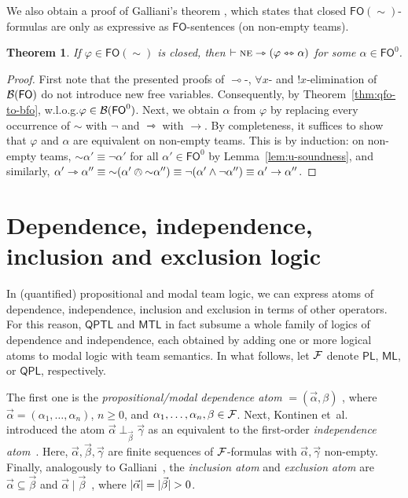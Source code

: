\documentclass[a4paper,english,fleqn,11pt,final]{scrartcl}
\makeatletter
\newcommand{\wloss}{w.l.o.g.\@\xspace}
\newcommand{\size}[1]{{\protect\ensuremath{\vert\nobreak#1\nobreak\vert}}}
\newcommand{\negg}{{\sim}}
\newcommand{\dep}[1]{{=\!\!(#1)}}
\newcommand{\logic}[1]{\ensuremath{\mathsf{#1}}\xspace}
\newcommand{\PL}{\logic{PL}}
\newcommand{\QPL}{\logic{QPL}}
\newcommand{\ML}{\logic{ML}}
\newcommand{\FO}{\logic{FO}}
\newcommand{\QPTL}{\logic{QPTL}}
\newcommand{\MTL}{\logic{MTL}}
\newcommand{\NE}{\text{\textsc{ne}}}
\newcommand{\calB}{\protect\ensuremath{\mathcal{B}}}
\newcommand{\calF}{\protect\ensuremath{\mathcal{F}}}
\newcommand{\imp}{\rightarrow}
\newcommand{\limp}{\multimap}
\newcommand{\timp}{\rightarrowtriangle}
\newcommand{\tequiv}{\leftrightarrowtriangle}
\DeclareMathOperator{\shriek}{!}
\DeclareMathOperator{\indep}{\perp}
\DeclareMathOperator{\exclusion}{\mid}
\theoremstyle{plain}
\newtheorem{theorem}{Theorem}[section]
\theoremstyle{definition}
\makeatother
\begin{document}
We also obtain a proof of Galliani's theorem \cite{Galliani14}, which states that closed $\FO(\negg)$-formulas are only as expressive as $\FO$-sentences (on non-empty teams).


\begin{theorem}
If $\varphi \in \FO(\negg)$ is closed, then $\vdash \NE \timp (\varphi \tequiv \alpha)$ for some $\alpha \in \FO^0$.
\end{theorem}
\begin{proof}
First note that the presented proofs of $\limp$-, $\forall x$- and $\shriek x$-elimination of $\calB(\FO)$ do not introduce new free variables.
Consequently, by Theorem~\ref{thm:qfo-to-bfo}, \wloss $\varphi \in \calB(\FO^0)$.
Next, we obtain $\alpha$ from $\varphi$ by replacing every occurrence of $\negg$ with $\neg$ and $\timp$ with $\imp$.
By completeness, it suffices to show that $\varphi$ and $\alpha$ are equivalent on non-empty teams.
This is by induction: on non-empty teams, $\negg\alpha'\equiv \neg\alpha'$ for all $\alpha' \in \FO^0$ by Lemma~\ref{lem:u-soundness}, and similarly, $\alpha' \timp \alpha'' \equiv \negg (\alpha' \owedge \negg \alpha'') \equiv \neg (\alpha' \land \neg \alpha'') \equiv \alpha' \imp \alpha''$.
\end{proof}
 
\section{Dependence, independence, inclusion and exclusion logic}\label{sec:fragments}

In (quantified) propositional and modal team logic, we can express atoms of dependence, independence, inclusion and exclusion in terms of other operators.
For this reason, $\QPTL$ and $\MTL$ in fact subsume a whole family of logics of dependence and independence, each obtained by adding one or more logical atoms to modal logic with team semantics.
In what follows, let $\calF$ denote $\PL$, $\ML$, or $\QPL$, respectively.


The first one is the \emph{propositional/modal dependence atom} $\dep{\vec{\alpha},\beta}$ \cite{yang_propositional_2016,vaananen_modal_2008,emdl}, where $\vec{\alpha} = (\alpha_1,\ldots,\alpha_n)$, $n \geq 0$, and $\alpha_1,\ldots,\alpha_n,\beta \in \calF$.
Next, Kontinen et~al.~\cite{mind} introduced the atom $\vec\alpha \indep_{\vec \beta} \vec \gamma$ as an equivalent to the first-order \emph{independence atom}~\cite{gradel2013dependence}.
Here, $\vec\alpha,\vec\beta,\vec\gamma$ are finite sequences of $\calF$-formulas with $\vec\alpha,\vec\gamma$ non-empty.
Finally, analogously to Galliani~\cite{galliani_inclusion_2012}, the \emph{inclusion atom} and \emph{exclusion atom} are $\vec{\alpha} \subseteq \vec{\beta}$ and $\vec{\alpha} \exclusion \vec{\beta}$~\cite{HellaS15}, where $\size{\vec\alpha} = \size{\vec\beta} > 0$.
\end{document}
